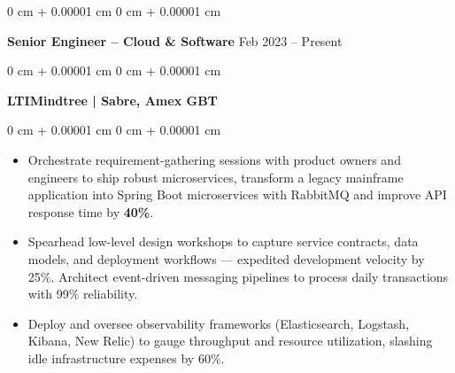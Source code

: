 \documentclass[10pt, letterpaper]{article}
\newenvironment{highlights}{
    \begin{itemize}[
        topsep=0.10 cm,
        parsep=0.10 cm,
        partopsep=0pt,
        itemsep=0pt,
        leftmargin=0 cm + 10pt
    ]
}{
    \end{itemize}
} %
\newenvironment{onecolentry}{
    \begin{adjustwidth}{
        0 cm + 0.00001 cm
    }{
        0 cm + 0.00001 cm
    }
}{
    \end{adjustwidth}
} %
\newenvironment{twocolentry}[2][]{
    \onecolentry
    \def\secondColumn{#2}
    \setcolumnwidth{\fill, 4.5 cm}
    \begin{paracol}{2}
}{
    \switchcolumn \raggedleft \secondColumn
    \end{paracol}
    \endonecolentry
} %
\begin{document}
        \begin{twocolentry}{Feb 2023 – Present}
            \textbf{Senior Engineer – Cloud \& Software} \end{twocolentry}
            \begin{onecolentry}
                \textbf{LTIMindtree | Sabre, Amex GBT}
            \end{onecolentry}
        \vspace{0.10 cm}
        \begin{onecolentry}
            \begin{highlights}
                \item Orchestrate requirement-gathering sessions with product owners and engineers to ship robust microservices, transform a legacy mainframe application into Spring Boot microservices with RabbitMQ and improve API response time by \textbf{40\%}.
                
                
                \item Spearhead low-level design workshops to capture service contracts, data models, and deployment workflows — expedited development velocity by 25\%. Architect event-driven messaging pipelines to process daily transactions with 99\% reliability. 

                \item Deploy and oversee observability frameworks (Elasticsearch, Logstash, Kibana, New Relic) to gauge throughput and resource utilization, slashing idle infrastructure expenses by 60\%.

            \end{highlights}
        \end{onecolentry}
\end{document}

